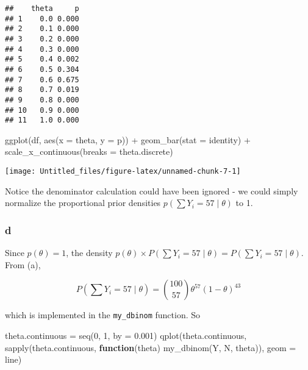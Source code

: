 \documentclass[
]{article}
\newenvironment{Shaded}{\begin{snugshade}}{\end{snugshade}}
\newcommand{\AttributeTok}[1]{\textcolor[rgb]{0.77,0.63,0.00}{#1}}
\newcommand{\ControlFlowTok}[1]{\textcolor[rgb]{0.13,0.29,0.53}{\textbf{#1}}}
\newcommand{\DecValTok}[1]{\textcolor[rgb]{0.00,0.00,0.81}{#1}}
\newcommand{\FloatTok}[1]{\textcolor[rgb]{0.00,0.00,0.81}{#1}}
\newcommand{\FunctionTok}[1]{\textcolor[rgb]{0.00,0.00,0.00}{#1}}
\newcommand{\NormalTok}[1]{#1}
\newcommand{\OtherTok}[1]{\textcolor[rgb]{0.56,0.35,0.01}{#1}}
\newcommand{\SpecialCharTok}[1]{\textcolor[rgb]{0.00,0.00,0.00}{#1}}
\newcommand{\StringTok}[1]{\textcolor[rgb]{0.31,0.60,0.02}{#1}}
\begin{document}
\begin{verbatim}
##    theta     p
## 1    0.0 0.000
## 2    0.1 0.000
## 3    0.2 0.000
## 4    0.3 0.000
## 5    0.4 0.002
## 6    0.5 0.304
## 7    0.6 0.675
## 8    0.7 0.019
## 9    0.8 0.000
## 10   0.9 0.000
## 11   1.0 0.000
\end{verbatim}

\begin{Shaded}
\begin{Highlighting}[]
\FunctionTok{ggplot}\NormalTok{(df, }\FunctionTok{aes}\NormalTok{(}\AttributeTok{x =}\NormalTok{ theta, }\AttributeTok{y =}\NormalTok{ p)) }\SpecialCharTok{+}
  \FunctionTok{geom\_bar}\NormalTok{(}\AttributeTok{stat =} \StringTok{\textquotesingle{}identity\textquotesingle{}}\NormalTok{) }\SpecialCharTok{+}
  \FunctionTok{scale\_x\_continuous}\NormalTok{(}\AttributeTok{breaks =}\NormalTok{ theta.discrete)}
\end{Highlighting}
\end{Shaded}

\begin{center}\texttt{[image: Untitled\_files/figure-latex/unnamed-chunk-7-1]} \end{center}

Notice the denominator calculation could have been ignored - we could
simply normalize the proportional prior densities
\(p(\sum Y_i = 57 \mid \theta)\) to 1.

\hypertarget{d}{%
\subsubsection{d}\label{d}}

Since \(p(\theta) = 1\), the density
\(p(\theta) \times P(\sum Y_i = 57 \mid \theta) = P(\sum Y_i = 57 \mid \theta)\).
From (a),

\[
P(\sum Y_i = 57 \mid \theta) = {100 \choose 57} \theta^{57} (1 - \theta)^{43}
\]

which is implemented in the \texttt{my\_dbinom} function. So

\begin{Shaded}
\begin{Highlighting}[]
\NormalTok{theta.continuous }\OtherTok{=} \FunctionTok{seq}\NormalTok{(}\DecValTok{0}\NormalTok{, }\DecValTok{1}\NormalTok{, }\AttributeTok{by =} \FloatTok{0.001}\NormalTok{)}
\FunctionTok{qplot}\NormalTok{(theta.continuous, }\FunctionTok{sapply}\NormalTok{(theta.continuous, }\ControlFlowTok{function}\NormalTok{(theta) }\FunctionTok{my\_dbinom}\NormalTok{(Y, N, theta)),}
      \AttributeTok{geom =} \StringTok{\textquotesingle{}line\textquotesingle{}}\NormalTok{)}
\end{Highlighting}
\end{Shaded}
\end{document}
